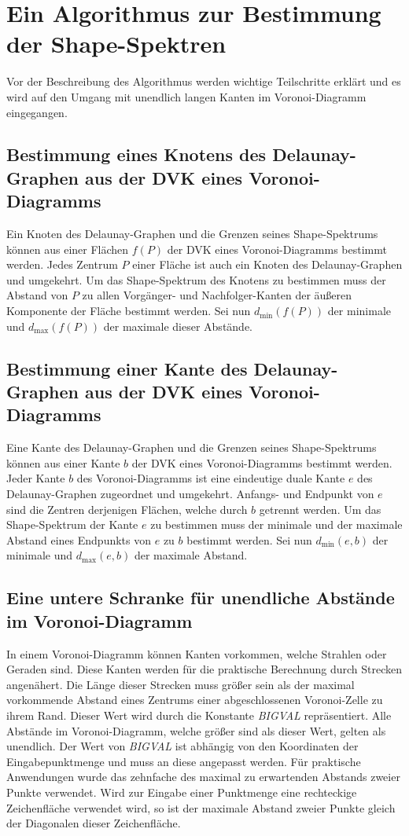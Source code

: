 \section{Ein Algorithmus zur Bestimmung der Shape-Spektren}

Vor der Beschreibung des Algorithmus werden wichtige Teilschritte erklärt und es wird auf den Umgang mit unendlich langen Kanten im Voronoi-Diagramm eingegangen.

\subsection*{Bestimmung eines Knotens des Delaunay-Graphen aus der DVK eines Voronoi-Diagramms}

Ein Knoten des Delaunay-Graphen und die Grenzen seines Shape-Spektrums können aus einer Flächen $f(P)$ der DVK eines Voronoi-Diagramms bestimmt werden. Jedes Zentrum $P$ einer Fläche ist auch ein Knoten des Delaunay-Graphen und umgekehrt. Um das Shape-Spektrum des Knotens zu bestimmen muss der Abstand von $P$ zu allen Vorgänger- und Nachfolger-Kanten der äußeren Komponente der Fläche bestimmt werden. Sei nun $d_{\min}(f(P))$ der minimale und $d_{\max}(f(P))$ der maximale dieser Abstände.

\subsection*{Bestimmung einer Kante des Delaunay-Graphen aus der DVK eines Voronoi-Diagramms}

Eine Kante des Delaunay-Graphen und die Grenzen seines Shape-Spektrums können aus einer Kante $b$ der DVK eines Voronoi-Diagramms bestimmt werden. Jeder Kante $b$ des Voronoi-Diagramms ist eine eindeutige duale Kante $e$ des Delaunay-Graphen zugeordnet und umgekehrt. Anfangs- und Endpunkt von $e$ sind die Zentren derjenigen Flächen, welche durch $b$ getrennt werden. Um das Shape-Spektrum der Kante $e$ zu bestimmen muss der minimale und der maximale Abstand eines Endpunkts von $e$ zu $b$ bestimmt werden. Sei nun $d_{\min}(e,b)$ der minimale und $d_{\max}(e,b)$ der maximale Abstand.

\subsection*{Eine untere Schranke für unendliche Abstände im Voronoi-Diagramm}

In einem Voronoi-Diagramm können Kanten vorkommen, welche Strahlen oder Geraden sind. Diese Kanten werden für die praktische Berechnung durch Strecken angenähert. Die Länge dieser Strecken muss größer sein als der maximal vorkommende Abstand eines Zentrums einer abgeschlossenen Voronoi-Zelle zu ihrem Rand. Dieser Wert wird durch die Konstante \emph{BIGVAL} repräsentiert. Alle Abstände im Voronoi-Diagramm, welche größer sind als dieser Wert, gelten als unendlich. Der Wert von \emph{BIGVAL} ist abhängig von den Koordinaten der Eingabepunktmenge und muss an diese angepasst werden. Für praktische Anwendungen wurde das zehnfache des maximal zu erwartenden Abstands zweier Punkte verwendet. Wird zur Eingabe einer Punktmenge eine rechteckige Zeichenfläche verwendet wird, so ist der maximale Abstand zweier Punkte gleich der Diagonalen dieser Zeichenfläche.


